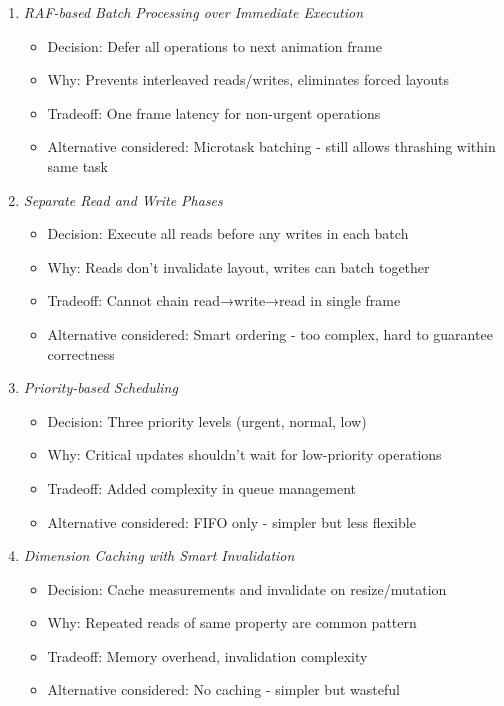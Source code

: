 \documentclass[11pt]{article}
\begin{document}
\begin{enumerate}
\item \emph{RAF-based Batch Processing over Immediate Execution}

\begin{itemize}
\item Decision: Defer all operations to next animation frame
\item Why: Prevents interleaved reads/writes, eliminates forced layouts
\item Tradeoff: One frame latency for non-urgent operations
\item Alternative considered: Microtask batching - still allows thrashing within same task
\end{itemize}

\item \emph{Separate Read and Write Phases}

\begin{itemize}
\item Decision: Execute all reads before any writes in each batch
\item Why: Reads don't invalidate layout, writes can batch together
\item Tradeoff: Cannot chain read→write→read in single frame
\item Alternative considered: Smart ordering - too complex, hard to guarantee correctness
\end{itemize}

\item \emph{Priority-based Scheduling}

\begin{itemize}
\item Decision: Three priority levels (urgent, normal, low)
\item Why: Critical updates shouldn't wait for low-priority operations
\item Tradeoff: Added complexity in queue management
\item Alternative considered: FIFO only - simpler but less flexible
\end{itemize}

\item \emph{Dimension Caching with Smart Invalidation}

\begin{itemize}
\item Decision: Cache measurements and invalidate on resize/mutation
\item Why: Repeated reads of same property are common pattern
\item Tradeoff: Memory overhead, invalidation complexity
\item Alternative considered: No caching - simpler but wasteful
\end{itemize}
\end{enumerate}
\end{document}
